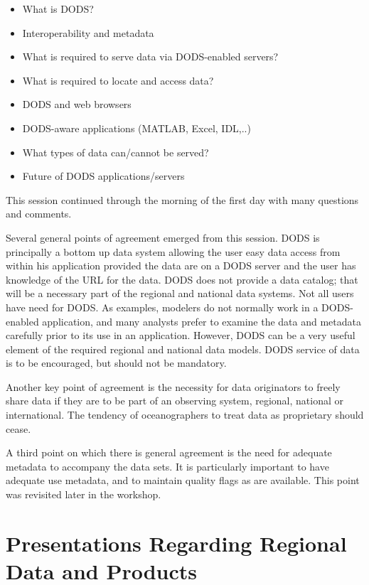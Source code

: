 \begin{itemize}
\item  What is DODS?
\item  Interoperability and metadata
\item         What is required to serve data via DODS-enabled servers?
\item         What is required to locate and access data?
\item         DODS and web browsers
\item         DODS-aware applications (MATLAB, Excel, IDL,..)
\item         What types of data can/cannot be served?
\item         Future of DODS applications/servers
\end{itemize}

This session continued through the morning of the first day with many
questions and comments.

Several general points of agreement emerged from this session. DODS is
principally a bottom up data system allowing the user easy data access
from within his application provided the data are on a DODS server and
the user has knowledge of the URL for the data. DODS does not provide
a data catalog; that will be a necessary part of the regional and
national data systems. Not all users have need for DODS. As examples,
modelers do not normally work in a DODS-enabled application, and many
analysts prefer to examine the data and metadata carefully prior to
its use in an application. However, DODS can be a very useful element
of the required regional and national data models. DODS service of
data is to be encouraged, but should not be mandatory.

Another key point of agreement is the necessity for data originators
to freely share data if they are to be part of an observing system,
regional, national or international. The tendency of oceanographers to
treat data as proprietary should cease.

A third point on which there is general agreement is the need for
adequate metadata to accompany the data sets. It is particularly
important to have adequate use metadata, and to maintain quality flags
as are available. This point was revisited later in the workshop.

\section{Presentations Regarding Regional Data and Products}

